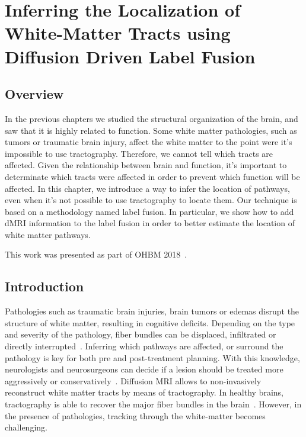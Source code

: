 \chapter{Inferring the Localization of White-Matter Tracts using Diffusion Driven Label Fusion}

\section{Overview}
In the previous chapters we studied the structural organization of the brain,
and saw that it is highly related to function. Some white matter pathologies,
such as tumors or traumatic brain injury, affect the white matter to the point
were it's impossible to use tractography. Therefore, we cannot tell which
tracts are affected. Given the relationship between brain and function, it's
important to determinate which tracts were affected in order to prevent
which function will be affected.
In this chapter, we introduce a way to infer the location of pathways, even
when it's not possible to use tractography to locate them. Our technique is
based on a methodology named label fusion. In particular, we show how to add
dMRI information to the label fusion in order to better estimate the location
of white matter pathways.

This work was presented as part of OHBM 2018~\cite{Guillermo2018}.

\section{Introduction}
Pathologies such as traumatic brain injuries, brain tumors or edemas disrupt
the structure of white matter, resulting in cognitive deficits. Depending on
the type and severity of the pathology, fiber bundles can be displaced,
infiltrated or directly interrupted~\cite{Schonberg2006, Huisman2009, Won2016}.
Inferring which pathways are affected, or surround the pathology is key for both
pre and post-treatment planning. With this knowledge, neurologists and
neurosurgeons can decide if a lesion should be treated more aggressively or 
conservatively~\cite{Huisman2009, McGirt2009}. Diffusion MRI allows to
non-invasively reconstruct white matter tracts by means of tractography. In
healthy brains, tractography is able to recover the major fiber bundles in the
brain~\cite{Catani2008}. However, in the presence of pathologies, tracking
through the white-matter becomes challenging.

